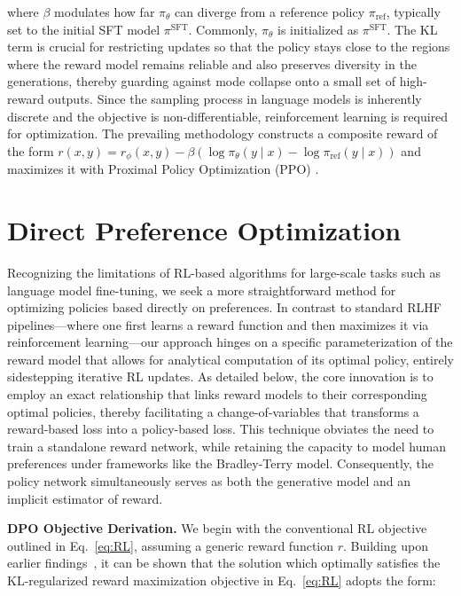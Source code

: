 where $\beta$ modulates how far $\pi_\theta$ can diverge from a reference policy $\pi_\text{ref}$, typically set to the initial SFT model $\pi^\text{SFT}$. Commonly, $\pi_\theta$ is initialized as $\pi^\text{SFT}$. The KL term is crucial for restricting updates so that the policy stays close to the regions where the reward model remains reliable and also preserves diversity in the generations, thereby guarding against mode collapse onto a small set of high-reward outputs. Since the sampling process in language models is inherently discrete and the objective is non-differentiable, reinforcement learning is required for optimization. The prevailing methodology \citep{ziegler2020finetuning, stiennon2022learning, bai2022training, ouyang2022training} constructs a composite reward of the form ${r(x, y) = r_{\phi}(x, y) -\beta (\log \pi_{\theta}(y\mid x) - \log \pi_\text{ref}(y\mid x))}$ and maximizes it with Proximal Policy Optimization (PPO) \cite{schulman2017proximal}.

\section{Direct Preference Optimization}\label{sec:DPO}

Recognizing the limitations of RL-based algorithms for large-scale tasks such as language model fine-tuning, we seek a more straightforward method for optimizing policies based directly on preferences. In contrast to standard RLHF pipelines—where one first learns a reward function and then maximizes it via reinforcement learning—our approach hinges on a specific parameterization of the reward model that allows for analytical computation of its optimal policy, entirely sidestepping iterative RL updates. As detailed below, the core innovation is to employ an exact relationship that links reward models to their corresponding optimal policies, thereby facilitating a change-of-variables that transforms a reward-based loss into a policy-based loss. This technique obviates the need to train a standalone reward network, while retaining the capacity to model human preferences under frameworks like the Bradley-Terry model. Consequently, the policy network simultaneously serves as both the generative model and an implicit estimator of reward.

\textbf{DPO Objective Derivation.} We begin with the conventional RL objective outlined in Eq.~\ref{eq:RL}, assuming a generic reward function $r$. Building upon earlier findings~\citep{peters2007reinforcement, peng2019advantage, korbak2022reinforcement, go2023aligning}, it can be shown that the solution which optimally satisfies the KL-regularized reward maximization objective in Eq.~\ref{eq:RL} adopts the form:

